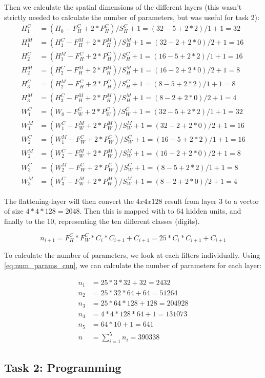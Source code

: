 Then we calculate the spatial dimensions of the different layers (this wasn't strictly needed to calculate the number of parameters, but was useful for task 2): 
\begin{align*}
    H_1^C &= (H_0 - F_H^C + 2 * P_H^C) / S_H^C + 1   = (32 - 5 + 2 * 2) / 1 + 1 = 32 \\
    H_1^M &= (H_1^C - F_H^M + 2 * P_H^M) / S_H^M + 1 = (32 - 2 + 2 * 0) / 2 + 1 = 16 \\
    H_2^C &= (H_1^M - F_H^C + 2 * P_H^C) / S_H^C + 1 = (16 - 5 + 2 * 2) / 1 + 1 = 16 \\
    H_2^M &= (H_2^C - F_H^M + 2 * P_H^M) / S_H^M + 1 = (16 - 2 + 2 * 0) / 2 + 1 = 8 \\
    H_3^C &= (H_2^M - F_H^C + 2 * P_H^C) / S_H^C + 1 = (8  - 5 + 2 * 2) / 1 + 1 = 8 \\
    H_3^M &= (H_3^C - F_H^M + 2 * P_H^M) / S_H^M + 1 = (8  - 2 + 2 * 0) / 2 + 1 = 4 \\
    W_1^C &= (W_0 - F_W^C + 2 * P_W^C) / S_W^C + 1   = (32 - 5 + 2 * 2) / 1 + 1 = 32 \\
    W_1^M &= (W_1^C - F_W^M + 2 * P_W^M) / S_W^M + 1 = (32 - 2 + 2 * 0) / 2 + 1 = 16 \\
    W_2^C &= (W_1^M - F_W^C + 2 * P_W^C) / S_W^C + 1 = (16 - 5 + 2 * 2) / 1 + 1 = 16 \\
    W_2^M &= (W_2^C - F_W^M + 2 * P_W^M) / S_W^M + 1 = (16 - 2 + 2 * 0) / 2 + 1 = 8 \\
    W_3^C &= (W_2^M - F_W^C + 2 * P_W^C) / S_W^C + 1 = (8  - 5 + 2 * 2) / 1 + 1 = 8 \\
    W_3^M &= (W_3^C - F_W^M + 2 * P_W^M) / S_W^M + 1 = (8  - 2 + 2 * 0) / 2 + 1 = 4 
\end{align*}

The flattening-layer will then convert the $4x4x128$ result from layer 3 to a vector of size $4 * 4 * 128 = 2048$. Then this is mapped with to 64 hidden units, and finally to the 10, representing the ten different classes (digits). 

\begin{equation}
    \label{eq:num_params_cnn}
    n_{i+1} = F_H^C * F_W^C * C_i * C_{i+1} + C_{i+1} = 25 * C_i * C_{i+1} + C_{i+1} 
\end{equation}

To calculate the number of parameters, we look at each filters individually. Using \cref{eq:num_params_cnn}, we can calculate the number of parameters for each layer: 

\begin{align*}
    n_1 &= 25 * 3  * 32  + 32 = 2432 \\
    n_2 &= 25 * 32 * 64  + 64 = 51264 \\
    n_3 &= 25 * 64 * 128 + 128 = 204928 \\
    n_4 &= 4 * 4 * 128 * 64 + 1 = 131073 \\
    n_5 &= 64 * 10 + 1 = 641 \\
    n   &= \sum_{i = 1}^5 n_i = 390338
\end{align*}

\newpage
\subsection{Task 2: Programming}

